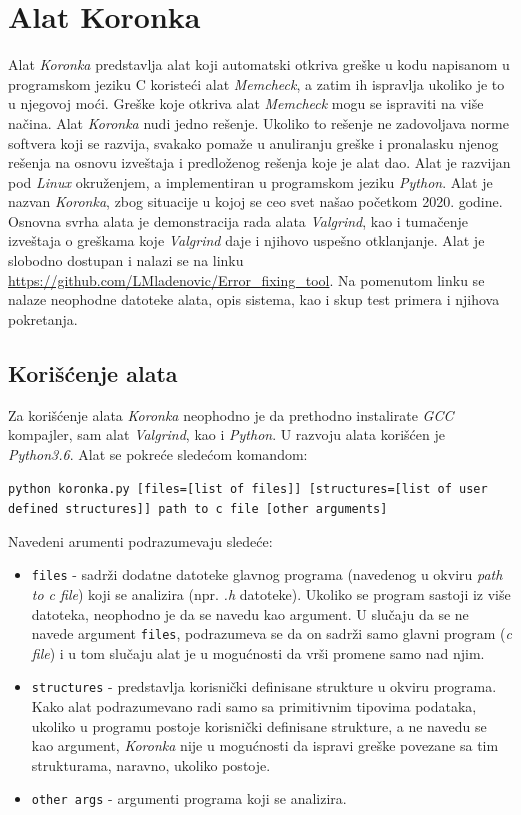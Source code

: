 \documentclass[12pt,oneside]{memoir}
\theoremstyle{plain}
\theoremstyle{definition}
\begin{document}

\chapter{Alat Koronka}
Alat \textit{Koronka} predstavlja alat koji automatski otkriva greške u kodu napisanom u programskom jeziku C koristeći alat \textit{Memcheck}, a zatim ih ispravlja ukoliko je to u njegovoj moći. Greške koje otkriva alat \textit{Memcheck} mogu se ispraviti na više načina. Alat \textit{Koronka} nudi jedno rešenje. Ukoliko to rešenje ne zadovoljava norme softvera koji se razvija, svakako pomaže u anuliranju greške i pronalasku njenog rešenja na osnovu izveštaja i predloženog rešenja koje je alat dao. Alat je razvijan pod \textit{Linux} okruženjem, a implementiran u programskom jeziku \textit{Python}. Alat je nazvan \textit{Koronka}, zbog situacije u kojoj se ceo svet našao početkom 2020. godine. Osnovna svrha alata je demonstracija rada alata \textit{Valgrind}, kao i tumačenje izveštaja o greškama koje \textit{Valgrind} daje i njihovo uspešno otklanjanje. Alat je slobodno dostupan i nalazi se na linku \url{https://github.com/LMladenovic/Error_fixing_tool}. Na pomenutom linku se nalaze neophodne datoteke alata, opis sistema, kao i skup test primera i njihova pokretanja.

\section{Korišćenje alata}
Za korišćenje alata \textit{Koronka} neophodno je da prethodno instalirate \textit{GCC} kompajler, sam alat \textit{Valgrind}, kao i \textit{Python}. U razvoju alata korišćen je \textit{Python3.6}. Alat se pokreće sledećom komandom:
\begin{center}
\texttt{python koronka.py [files=[list of files]] [structures=[list of user defined structures]] path to c file [other arguments]}
\end{center}
Navedeni arumenti podrazumevaju sledeće:
\begin{itemize}
\item \texttt{files} - sadrži dodatne datoteke glavnog programa (navedenog u okviru \textit{path to c file}) koji se analizira (npr. \textit{.h} datoteke). Ukoliko se program sastoji iz više datoteka, neophodno je da se navedu kao argument. U slučaju da se ne navede argument \texttt{files}, podrazumeva se da on sadrži samo glavni program (\textit{c file}) i u tom slučaju alat je u mogućnosti da vrši promene samo nad njim.
\item \texttt{structures} - predstavlja korisnički definisane strukture u okviru programa. Kako alat podrazumevano radi samo sa primitivnim tipovima podataka, ukoliko u programu postoje korisnički definisane strukture, a ne navedu se kao argument, \textit{Koronka} nije u mogućnosti da ispravi greške povezane sa tim strukturama, naravno, ukoliko postoje.
\item \texttt{other args} - argumenti programa koji se analizira.
\end{itemize}
\end{document}
